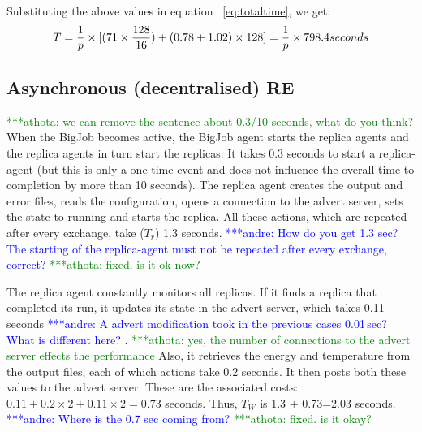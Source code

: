 \documentclass{rspublic}
\newcommand{\alnote}[1]{ {\textcolor{blue} { ***andre: #1 }}}
\newcommand{\athotanote}[1]{ {\textcolor{green} { ***athota: #1 }}}
\newcommand{\alnote}[1]{}
\newcommand{\athotanote}[1]{}
\begin{document}
{Substituting the above values in equation ~\ref{eq:totaltime}, we get:
\begin{eqnarray}
T=  {1 \over p} \times {[ {(71\times {128\over 16}}) + (0.78 + 1.02)\times 128]} = {1 \over p} \times 798.4 seconds
\label{eq:cent}
\end{eqnarray}


\subsection{Asynchronous (decentralised) RE}

\athotanote{we can remove the sentence about 0.3/10 seconds, what do you think?}When the BigJob becomes active, the BigJob agent starts the replica
agents and the replica agents in turn start the replicas. It takes 0.3
seconds to start a replica-agent (but this is only a one time event and does not influence the overall time to completion by more than 10 seconds). The replica agent creates the
output and error files, reads the configuration, opens a connection to the advert server, sets the state to running and starts the
replica. All these actions, which are repeated after every exchange,
take ($T_r$) 1.3 seconds. \alnote{How do you get 1.3 sec? The starting of the replica-agent
must not be repeated after every exchange, correct?} \athotanote{fixed. is it ok now?}

The replica agent constantly monitors all replicas. If it finds
a replica that completed its run, it updates its state in the advert
server, which takes 0.11 seconds \alnote{A advert modification took in the previous
cases 0.01\,sec? What is different here?}.\athotanote{yes, the number of connections to the advert server effects the performance} Also, it retrieves the energy and
temperature from the output files, each of which actions take 0.2
seconds. It then posts both these values to the advert server. These are the associated costs: $0.11+0.2\times2+0.11\times2=0.73$ seconds.  Thus,
$T_W$ is 1.3 + 0.73=2.03 seconds.\alnote{Where is the 0.7 sec coming from?} \athotanote{fixed. is it okay?}

}
\end{document}
